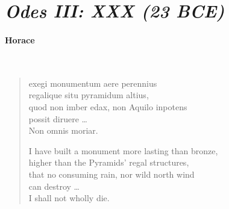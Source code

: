 \documentclass[12pt, openany, letterpaper]{memoir}
\begin{document}
\vspace{8em}
\hspace{0.3\linewidth}
\begin{minipage}{0.7\linewidth}
\section*{\emph{Odes III: XXX (23 BCE)}}
\paragraph{Horace}~
\begin{verse}
exegi monumentum aere perennius\\
regalique situ pyramidum altius,\\
quod non imber edax, non Aquilo inpotens\\
possit diruere \ldots\\
Non omnis moriar.

I have built a monument more lasting than bronze,\\
higher than the Pyramids’ regal structures,\\
that no consuming rain, nor wild north wind\\
can destroy \ldots\\
I shall not wholly die.
\end{verse}
\end{minipage}
\end{document}
